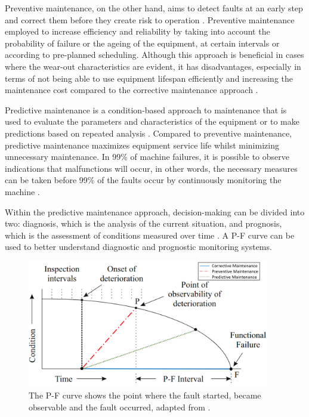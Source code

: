 Preventive maintenance, on the other hand, aims to detect faults at an early step and correct them before they create risk to operation \cite{en201713306}. Preventive maintenance employed to increase efficiency and reliability by taking into account the probability of failure or the ageing of the equipment, at certain intervals or according to pre-planned scheduling. Although this approach is beneficial in cases where the wear-out characteristics are evident, it has disadvantages, especially in terms of not being able to use equipment lifespan efficiently and increasing the maintenance cost compared to the corrective maintenance approach \cite{AHMAD}.

Predictive maintenance is a condition-based approach to maintenance that is used to evaluate the parameters and characteristics of the equipment or to make predictions based on repeated analysis \cite{en201713306}. Compared to preventive maintenance, predictive maintenance maximizes equipment service life whilst minimizing unnecessary maintenance. In 99\% of machine failures, it is possible to observe indications that malfunctions will occur, in other words, the necessary measures can be taken before 99\% of the faults occur by continuously monitoring the machine \cite{AHMAD}.

Within the predictive maintenance approach, decision-making can be divided into two: diagnosis, which is the analysis of the current situation, and prognosis, which is the assessment of conditions measured over time \cite{tinga2019physical}. A P-F curve can be used to better understand diagnostic and prognostic monitoring systems.

\begin{figure}[h]
	\centering
	\includegraphics[width=300pt,keepaspectratio=true]{./fig/PFdiagram.png}
	\caption{The P-F curve shows the point where the fault started, became observable and the fault occurred, adapted from \cite{tinga2019physical}.}	
	\label{PF_diagram}
\end{figure}

